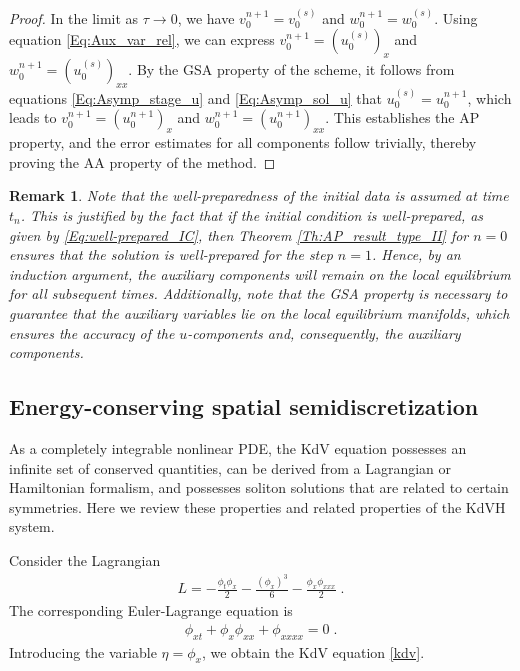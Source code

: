 \documentclass{article}
\newcommand{\ukdv}{\eta}
\newtheorem{remark}{Remark}
\begin{document}
\begin{proof}
In the limit as $\tau \to 0$, we have $v_0^{n+1} = v_0^{(s)}$ and $w_0^{n+1} = w_0^{(s)}$. Using equation
\eqref{Eq:Aux_var_rel}, we can express $v_0^{n+1} = (u_0^{(s)})_x$ and $w_0^{n+1} = (u_0^{(s)})_{xx}$.
By the GSA property of the scheme, it follows from equations \eqref{Eq:Asymp_stage_u} and \eqref{Eq:Asymp_sol_u}
that $u_0^{(s)} = u_0^{n+1}$, which leads to $v_0^{n+1} = (u_0^{n+1})_x$ and $w_0^{n+1} = (u_0^{n+1})_{xx}$.
This establishes the AP property, and the error estimates for all components follow trivially, thereby proving
the AA property of the method.
\end{proof}

\begin{remark} \label{rem:req-GSA}
    Note that the well-preparedness of the initial data is assumed at time $t_n$. This is justified by the fact that if
    the initial condition is well-prepared, as given by \eqref{Eq:well-prepared_IC}, then Theorem \ref{Th:AP_result_type_II}
    for $n = 0$ ensures that the solution is well-prepared for the step $n = 1$. Hence, by an induction argument,
    the auxiliary components will remain on the local equilibrium for all subsequent times. Additionally,
    note that the GSA property is necessary to guarantee that the auxiliary variables lie on the local equilibrium manifolds,
    which ensures the accuracy of the $u$-components and, consequently, the auxiliary components.
\end{remark}


\subsection{Energy-conserving spatial semidiscretization} \label{sec:space-disc}

As a completely integrable nonlinear PDE, the KdV equation possesses
an infinite set of conserved quantities, can be derived from a
Lagrangian or Hamiltonian formalism, and possesses soliton solutions
that are related to certain symmetries.  Here we review these properties
and related properties of the KdVH system.

Consider the Lagrangian
\begin{align*}
    L = -\frac{\phi_t \phi_x}{2} - \frac{(\phi_x)^3}{6} - \frac{\phi_x\phi_{xxx}}{2} \;.
\end{align*}
The corresponding Euler-Lagrange equation is
\begin{align*}
    \phi_{xt} + \phi_x\phi_{xx} + \phi_{xxxx} = 0 \;.
\end{align*}
Introducing the variable $ \ukdv = \phi_x $, we obtain the KdV equation \eqref{kdv}.
\end{document}
